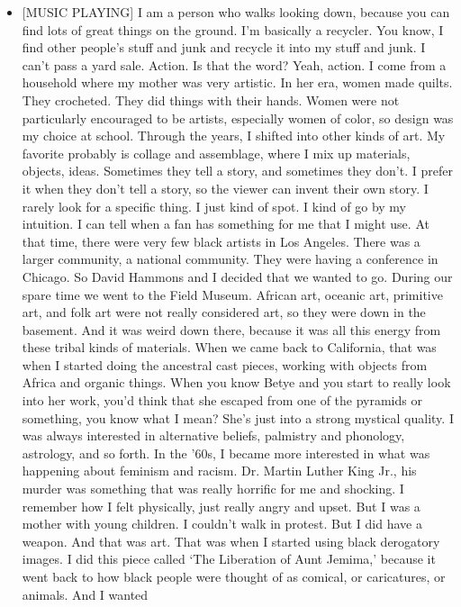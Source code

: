 \begin{itemize}
\tightlist
\item
  {[}MUSIC PLAYING{]} I am a person who walks looking down, because you
  can find lots of great things on the ground. I'm basically a recycler.
  You know, I find other people's stuff and junk and recycle it into my
  stuff and junk. I can't pass a yard sale. Action. Is that the word?
  Yeah, action. I come from a household where my mother was very
  artistic. In her era, women made quilts. They crocheted. They did
  things with their hands. Women were not particularly encouraged to be
  artists, especially women of color, so design was my choice at school.
  Through the years, I shifted into other kinds of art. My favorite
  probably is collage and assemblage, where I mix up materials, objects,
  ideas. Sometimes they tell a story, and sometimes they don't. I prefer
  it when they don't tell a story, so the viewer can invent their own
  story. I rarely look for a specific thing. I just kind of spot. I kind
  of go by my intuition. I can tell when a fan has something for me that
  I might use. At that time, there were very few black artists in Los
  Angeles. There was a larger community, a national community. They were
  having a conference in Chicago. So David Hammons and I decided that we
  wanted to go. During our spare time we went to the Field Museum.
  African art, oceanic art, primitive art, and folk art were not really
  considered art, so they were down in the basement. And it was weird
  down there, because it was all this energy from these tribal kinds of
  materials. When we came back to California, that was when I started
  doing the ancestral cast pieces, working with objects from Africa and
  organic things. When you know Betye and you start to really look into
  her work, you'd think that she escaped from one of the pyramids or
  something, you know what I mean? She's just into a strong mystical
  quality. I was always interested in alternative beliefs, palmistry and
  phonology, astrology, and so forth. In the '60s, I became more
  interested in what was happening about feminism and racism. Dr. Martin
  Luther King Jr., his murder was something that was really horrific for
  me and shocking. I remember how I felt physically, just really angry
  and upset. But I was a mother with young children. I couldn't walk in
  protest. But I did have a weapon. And that was art. That was when I
  started using black derogatory images. I did this piece called `The
  Liberation of Aunt Jemima,' because it went back to how black people
  were thought of as comical, or caricatures, or animals. And I wanted

\end{itemize}
